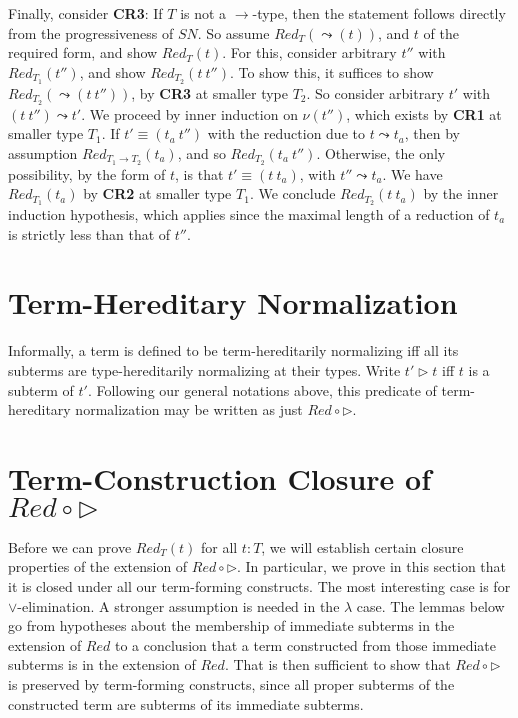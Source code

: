 \documentclass{article}
\newcommand{\red}[0]{\textit{Red}}
\newcommand{\sn}[0]{\textit{SN}}
\begin{document}
Finally, consider \textbf{CR3}: If $T$ is not a $\to$-type, then the
statement follows directly from the progressiveness of $\sn$.  So
assume $\red_T(\leadsto(t))$, and $t$ of the required form, and show
$\red_T(t)$.  For this, consider arbitrary $t''$ with
$\red_{T_1}(t'')$, and show $\red_{T_2}(t\ t'')$.  To show this, it
suffices to show $\red_{T_2}(\leadsto(t\ t''))$, by \textbf{CR3} at
smaller type $T_2$.  So consider arbitrary $t'$ with $(t\ t'')\leadsto
t'$.  We proceed by inner induction on $\nu(t'')$, which exists by
\textbf{CR1} at smaller type $T_1$.  If $t' \equiv (t_a\ t'')$ with
the reduction due to $t\leadsto t_a$, then by assumption $\red_{T_1\to
T_2}(t_a)$, and so $\red_{T_2}(t_a\ t'')$.  Otherwise, the only
possibility, by the form of $t$, is that $t' \equiv (t\ t_a)$, with
$t'' \leadsto t_a$.  We have $\red_{T_1}(t_a)$ by \textbf{CR2} at
smaller type $T_1$.  We conclude $\red_{T_2}(t\ t_a)$ by the inner
induction hypothesis, which applies since the maximal length of a
reduction of $t_a$ is strictly less than that of $t''$.

\section{Term-Hereditary Normalization}

Informally, a term is defined to be term-hereditarily normalizing iff
all its subterms are type-hereditarily normalizing at their types.
Write $t' \rhd t$ iff $t$ is a subterm of $t'$.  Following our general
notations above, this predicate of term-hereditary normalization may
be written as just $\red \circ \rhd$.

\section{Term-Construction Closure of $\red \circ \rhd$}

Before we can prove $\red_T(t)$ for all $t : T$, we will establish
certain closure properties of the extension of $\red \circ \rhd$.  In
particular, we prove in this section that it is closed under all our
term-forming constructs.  The most interesting case is for
$\vee$-elimination.  A stronger assumption is needed in the $\lambda$
case.  The lemmas below go from hypotheses about the membership of
immediate subterms in the extension of $\red$ to a conclusion that a
term constructed from those immediate subterms is in the extension of
$\red$.  That is then sufficient to show that $\red \circ \rhd$ is
preserved by term-forming constructs, since all proper subterms of the
constructed term are subterms of its immediate subterms.
\end{document}
